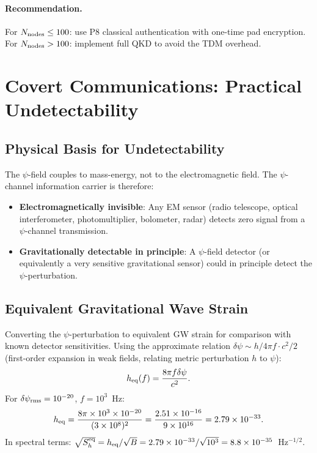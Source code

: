 \documentclass[aps,prd,twocolumn,superscriptaddress,nofootinbib]{revtex4-2}
\begin{document}
\paragraph{Recommendation.} For $N_{\rm nodes} \leq 100$: use P8 classical
authentication with one-time pad encryption. For $N_{\rm nodes} > 100$:
implement full QKD to avoid the TDM overhead.

\section{Covert Communications: Practical Undetectability}
\label{sec:covert}

\subsection{Physical Basis for Undetectability}

The $\psi$-field couples to mass-energy, not to the electromagnetic field.
The $\psi$-channel information carrier is therefore:
\begin{itemize}
\item \textbf{Electromagnetically invisible}: Any EM sensor (radio
telescope, optical interferometer, photomultiplier, bolometer, radar)
detects zero signal from a $\psi$-channel transmission.
\item \textbf{Gravitationally detectable in principle}: A $\psi$-field
detector (or equivalently a very sensitive gravitational sensor) could
in principle detect the $\psi$-perturbation.
\end{itemize}

\subsection{Equivalent Gravitational Wave Strain}

Converting the $\psi$-perturbation to equivalent GW strain for comparison
with known detector sensitivities. Using the approximate relation
$\delta\psi \sim h/4\pi f \cdot c^2/2$ (first-order expansion in weak
fields, relating metric perturbation $h$ to $\psi$):
\begin{equation}
h_{\rm eq}(f) = \frac{8\pi f \delta\psi}{c^2}.
\end{equation}
For $\delta\psi_{\rm rms} = 10^{-20}$, $f = 10^3$~Hz:
\begin{equation}
h_{\rm eq} = \frac{8\pi \times 10^3 \times 10^{-20}}{(3\times 10^8)^2}
= \frac{2.51\times 10^{-16}}{9\times 10^{16}} = 2.79\times 10^{-33}.
\label{eq:h-equivalent}
\end{equation}
In spectral terms:
$\sqrt{S_h^{\rm eq}} = h_{\rm eq}/\sqrt{B} = 2.79\times 10^{-33}/\sqrt{10^3}
= 8.8\times 10^{-35}$~Hz$^{-1/2}$.
\end{document}
